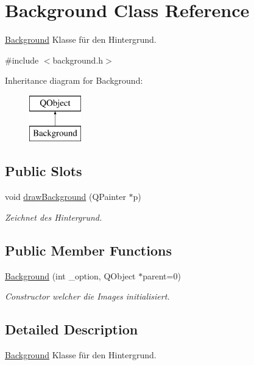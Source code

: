 \hypertarget{class_background}{}\section{Background Class Reference}
\label{class_background}


\hyperlink{class_background}{Background} Klasse für den Hintergrund.  




{\ttfamily \#include $<$background.\+h$>$}

Inheritance diagram for Background\+:\begin{figure}[H]
\begin{center}
\leavevmode
\includegraphics[height=2.000000cm]{class_background}
\end{center}
\end{figure}
\subsection*{Public Slots}
\begin{DoxyCompactItemize}
\item 
void \hyperlink{class_background_a57a08d996f7dd00395078adaf71cb223}{draw\+Background} (Q\+Painter $\ast$p)
\begin{DoxyCompactList}\small\item\em Zeichnet des Hintergrund. \end{DoxyCompactList}\end{DoxyCompactItemize}
\subsection*{Public Member Functions}
\begin{DoxyCompactItemize}
\item 
\hyperlink{class_background_ae3a96452f46575f9a43cecd172a26567}{Background} (int \+\_\+option, Q\+Object $\ast$parent=0)
\begin{DoxyCompactList}\small\item\em Constructor welcher die Images initialisiert. \end{DoxyCompactList}\end{DoxyCompactItemize}


\subsection{Detailed Description}
\hyperlink{class_background}{Background} Klasse für den Hintergrund. 

